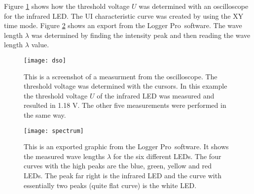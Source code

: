 Figure \ref{fig:dso} shows how the threshold voltage $U$ was determined with an oscilloscope for the infrared LED. The UI characteristic curve was created by using the XY time mode. Figure \ref{fig:spectrum} shows an export from the \flqq Logger Pro\frqq\ software. The wave length $\lambda$ was determined by finding the intensity peak and then reading the wave length $\lambda$ value.

\newpage
\begin{figure}[H]
	\centering
	\texttt{[image: dso]}
	\caption{This is a screenshot of a measurment from the oscilloscope. The threshold voltage was determined with the cursors. In this example the threshold voltage $U$ of the infrared LED was measured and resulted in 1.18 V. The other five measurements were performed in the same way.}
	\label{fig:dso}
\end{figure}

\begin{figure}[H]
	\centering
	\texttt{[image: spectrum]}
	\caption{This is an exported graphic from the \flqq Logger Pro\frqq\ software. It shows the measured wave lengths $\lambda$ for the six different LEDs. The four curves with the high peaks are the blue, green, yellow and red LEDs. The peak far right is the infrared LED and the curve with essentially two peaks (quite flat curve) is the white LED.}
	\label{fig:spectrum}
\end{figure}
